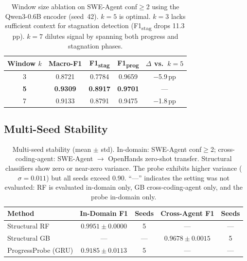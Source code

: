 \begin{table}[h]
\centering
\small
\begin{tabular}{ccccc}
\toprule
\textbf{Window $k$} & \textbf{Macro-F1} & \textbf{F1\textsubscript{stag}} & \textbf{F1\textsubscript{prog}} & \textbf{$\Delta$ vs.\ $k{=}5$} \\
\midrule
3 & 0.8721 & 0.7784 & 0.9659 & $-$5.9\,pp \\
\textbf{5} & \textbf{0.9309} & \textbf{0.8917} & \textbf{0.9701} & --- \\
7 & 0.9133 & 0.8791 & 0.9475 & $-$1.8\,pp \\
\bottomrule
\end{tabular}
\caption{Window size ablation on SWE-Agent conf${\geq}$2 using the Qwen3-0.6B encoder (seed~42). $k{=}5$ is optimal. $k{=}3$ lacks sufficient context for stagnation detection (F1\textsubscript{stag} drops 11.3\,pp). $k{=}7$ dilutes signal by spanning both progress and stagnation phases.}
\label{tab:window_ablation}
\end{table}

\subsection{Multi-Seed Stability}
\label{sec:app_multiseed}

\begin{table}[h]
\centering
\small
\begin{tabular}{lcccc}
\toprule
\textbf{Method} & \textbf{In-Domain F1} & \textbf{Seeds} & \textbf{Cross-Agent F1} & \textbf{Seeds} \\
\midrule
Structural RF & $0.9951 \pm 0.0000$ & 5 & --- & --- \\
Structural GB & --- & --- & $0.9678 \pm 0.0015$ & 5 \\
ProgressProbe (GRU) & $0.9185 \pm 0.0113$ & 5 & --- & --- \\
\bottomrule
\end{tabular}
\caption{Multi-seed stability (mean $\pm$ std). In-domain: SWE-Agent conf${\geq}$2; cross-coding-agent: SWE-Agent $\to$ OpenHands zero-shot transfer. Structural classifiers show zero or near-zero variance. The probe exhibits higher variance ($\sigma{=}0.011$) but all seeds exceed 0.90. ``---'' indicates the setting was not evaluated: RF is evaluated in-domain only, GB cross-coding-agent only, and the probe in-domain only.}
\label{tab:multiseed}
\end{table}

